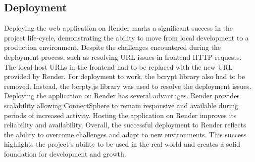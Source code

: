 \subsection{Deployment}
Deploying the web application on Render marks a significant success in the project life-cycle, demonstrating the ability to move from local development to a production environment. Despite the challenges encountered during the deployment process, such as resolving URL issues in frontend HTTP requests. The local-host URLs in the frontend had to be replaced with the new URL provided by Render. For deployment to work, the bcrypt library also had to be removed. Instead, the bcrpty.js library was used to resolve the deployment issues. Deploying the application on Render has several advantages. Render provides scalability allowing ConnectSphere to remain responsive and available during periods of increased activity. Hosting the application on Render improves its reliability and availability. Overall, the successful deployment to Render reflects the ability to overcome challenges and adapt to new environments. This success highlights the project's ability to be used in the real world and creates a solid foundation for development and growth.